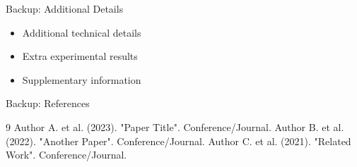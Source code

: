 \documentclass[aspectratio=169]{beamer}
\begin{document}

\appendix

\begin{frame}{Backup: Additional Details}
    \begin{itemize}
        \item Additional technical details
        \item Extra experimental results
        \item Supplementary information
    \end{itemize}
\end{frame}

\begin{frame}{Backup: References}
    \begin{thebibliography}{9}
         Author A. et al. (2023). "Paper Title". Conference/Journal.
         Author B. et al. (2022). "Another Paper". Conference/Journal.
         Author C. et al. (2021). "Related Work". Conference/Journal.
    \end{thebibliography}
\end{frame}
\end{document}
